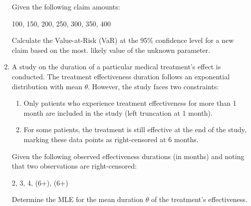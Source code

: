 \documentclass{article}
\begin{document}
\begin{enumerate}
Given the following claim amounts:
\begin{center}
100, 150, 200, 250, 300, 350, 400
\end{center}
Calculate the Value-at-Risk (VaR) at the 95\% confidence level for a new claim based on the most. likely value of the unknown parameter. 
\item A study on the duration of a particular medical treatment's effect is conducted. The treatment effectiveness duration follows an exponential distribution with mean \(\theta\). However, the study faces two constraints:

\begin{enumerate}
    \item Only patients who experience treatment effectiveness for more than 1 month are included in the study (left truncation at 1 month).
    \item For some patients, the treatment is still effective at the end of the study, marking these data points as right-censored at 6 months.
\end{enumerate}

Given the following observed effectiveness durations (in months) and noting that two observations are right-censored:
\begin{center}
2, 3, 4, (6+), (6+)
\end{center}
Determine the MLE for the mean duration \(\theta\) of the treatment's effectiveness. 




	\end{enumerate}
\end{document}
